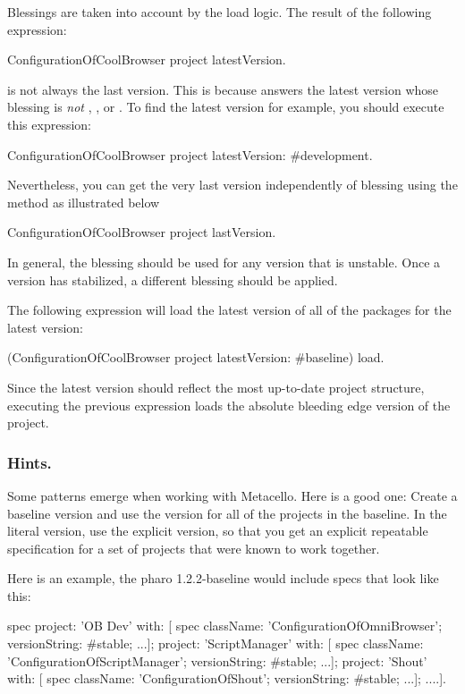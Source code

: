 \documentclass[a4paper,10pt,twoside]{book}
\begin{document}
Blessings are taken into account by the load logic. The result of the following expression:
\begin{code}{}
ConfigurationOfCoolBrowser project latestVersion.
\end{code}
is not always the last version.  This is because  answers the latest version whose blessing is {\em not} , , or . To find the latest  version for example, you should execute this expression:

\begin{code}{}
ConfigurationOfCoolBrowser project latestVersion: #development.
\end{code}

Nevertheless, you can get the very last version independently of blessing using the  method as illustrated below

\begin{code}{}
ConfigurationOfCoolBrowser project lastVersion.
\end{code}

In general, the  blessing should be used for any version that is unstable. Once a version has stabilized, a different blessing should be applied.

The following expression will load the latest version of all of the packages for the latest  version:
 \begin{code}{}
(ConfigurationOfCoolBrowser project latestVersion: #baseline) load.
\end{code}

Since the latest  version should reflect the most up-to-date project structure, executing the previous expression loads the absolute bleeding edge version of the project.


\subsubsection{Hints.}
Some patterns emerge when working with Metacello. Here is a good one:
Create a baseline version and use the  version for all of the projects in the baseline. In the literal version, use the explicit version, so that you get an explicit repeatable specification for a set of projects that were known to work together.

Here is an example, the pharo 1.2.2-baseline would include specs that look like this:

\begin{code}{}
 spec
    project: 'OB Dev' with: [
      spec
         className: 'ConfigurationOfOmniBrowser';
         versionString: #stable;
         ...];
    project: 'ScriptManager' with: [
      spec
         className: 'ConfigurationOfScriptManager';
         versionString: #stable;
         ...];
    project: 'Shout' with: [
      spec
         className: 'ConfigurationOfShout';
         versionString: #stable;
         ...];
    ....].
\end{code}
\end{document}
